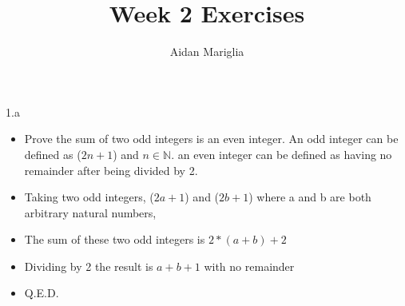 \documentclass[12pt]{article}
\title{Week 2 Exercises}
\author{Aidan Mariglia}
\begin{document}
\large 1.a

\begin{itemize}

\item Prove the sum of two odd integers is an even integer. 
An odd integer can be defined as ($2n + 1$) and
$n \in \mathbb{N}$.
an even integer can be defined as having no remainder after being divided by 2. 


\item Taking two odd integers, ($2a + 1$) and ($2b + 1$) where a and b are 
both arbitrary natural numbers,

\item The sum of these two odd integers is $2 * (a + b) + 2$

\item Dividing by 2 the result is $a + b + 1$ with no remainder
\item Q.E.D.
\end{itemize}
\end{document}
